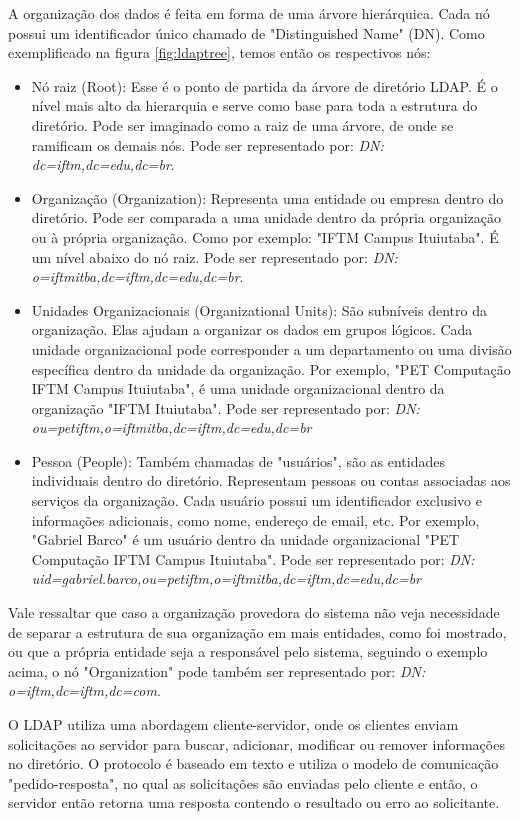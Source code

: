 A organização dos dados é feita em forma de uma árvore hierárquica. Cada nó possui um identificador único chamado de "Distinguished Name" (DN). Como exemplificado na figura \ref{fig:ldaptree}, temos então os respectivos nós:
\begin{itemize}
	\item Nó raiz (Root): Esse é o ponto de partida da árvore de diretório LDAP. É o nível mais alto da hierarquia e serve como base para toda a estrutura do diretório. Pode ser imaginado como a raiz de uma árvore, de onde se ramificam os demais nós. Pode ser representado por: \textit{DN: dc=iftm,dc=edu,dc=br}.
    \item Organização (Organization): Representa uma entidade ou empresa dentro do diretório. Pode ser comparada a uma unidade dentro da própria organização ou à própria organização. Como por exemplo: "IFTM Campus Ituiutaba". É um nível abaixo do nó raiz. Pode ser representado por: \textit{DN: o=iftmitba,dc=iftm,dc=edu,dc=br}.
    \item Unidades Organizacionais (Organizational Units): São subníveis dentro da organização. Elas ajudam a organizar os dados em grupos lógicos. Cada unidade organizacional pode corresponder a um departamento ou uma divisão específica dentro da unidade da organização. Por exemplo, "PET Computação IFTM Campus Ituiutaba", é uma unidade organizacional dentro da organização "IFTM Ituiutaba". Pode ser representado por: \textit{DN: ou=petiftm,o=iftmitba,dc=iftm,dc=edu,dc=br}
    \item Pessoa (People): Também chamadas de "usuários", são as entidades individuais dentro do diretório. Representam pessoas ou contas associadas aos serviços da organização. Cada usuário possui um identificador exclusivo e informações adicionais, como nome, endereço de email, etc. Por exemplo, "Gabriel Barco" é um usuário dentro da unidade organizacional "PET Computação IFTM Campus Ituiutaba". Pode ser representado por: \textit{DN: uid=gabriel.barco,ou=petiftm,o=iftmitba,dc=iftm,dc=edu,dc=br}
\end{itemize}

Vale ressaltar que caso a organização provedora do sistema não veja necessidade de separar a estrutura de sua organização em mais entidades, como foi mostrado, ou que a própria entidade seja a responsável pelo sistema, seguindo o exemplo acima, o nó "Organization" pode também ser representado por: \textit{DN: o=iftm,dc=iftm,dc=com}.

O LDAP utiliza uma abordagem cliente-servidor, onde os clientes enviam solicitações ao servidor para buscar, adicionar, modificar ou remover informações no diretório. O protocolo é baseado em texto e utiliza o modelo de comunicação "pedido-resposta", no qual as solicitações são enviadas pelo cliente e então, o servidor então retorna uma resposta contendo o resultado ou erro ao solicitante. 

